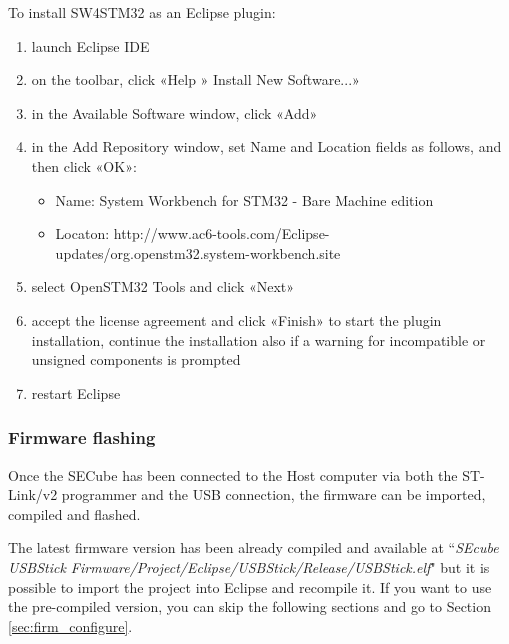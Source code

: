 To install SW4STM32 as an Eclipse plugin:
\begin{enumerate}
	\item launch Eclipse IDE
	\item on the toolbar, click «Help » Install New Software...»
	\item in the Available Software window, click «Add»
	\item in the Add Repository window, set Name and Location fields as follows, and then click «OK»:
	\begin{itemize}
		\item Name: System Workbench for STM32 - Bare Machine edition
		\item Locaton: http://www.ac6-tools.com/Eclipse-updates/org.openstm32.system-workbench.site
	\end{itemize}
	\item select OpenSTM32 Tools and click «Next»
	\item accept the license agreement and click «Finish» to start the plugin installation, continue the installation also if a warning for incompatible or unsigned components is prompted
	\item restart Eclipse
\end{enumerate}



\subsubsection{Firmware flashing}
Once the SECube has been connected to the Host computer via both the ST-Link/v2 programmer and the USB connection, the firmware can be imported, compiled and flashed. 

The latest firmware version has been already compiled and available at ``\textit{SEcube USBStick Firmware/Project/Eclipse/USBStick/Release/USBStick.elf}" but it is possible to import the project into Eclipse and recompile it. If you want to use the pre-compiled version, you can skip the following sections and go to Section \ref{sec:firm_configure}.

